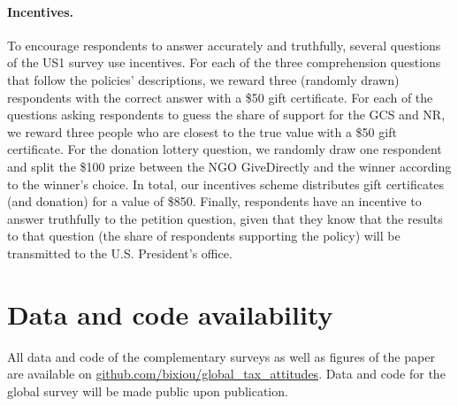 \begin{small}
\paragraph{\small Incentives.} %
To encourage respondents to answer accurately and truthfully, several questions of the US1 survey use incentives. For each of the three comprehension questions that follow the policies' descriptions, we reward three (randomly drawn) respondents with the correct answer with a \$50 gift certificate. For each of the questions asking respondents to guess the share of support for the GCS and NR, we reward three people who are closest to the true value with a \$50 gift certificate. For the donation lottery question, we randomly draw one respondent and split the \$100 prize between the NGO GiveDirectly and the winner according to the winner's choice. In total, our incentives scheme distributes gift certificates (and donation) for a value of \$850. Finally, respondents have an incentive to answer truthfully to the petition question, given that they know that the results to that question (the share of respondents supporting the policy) will be transmitted to the U.S. President's office.


\section*{\normalsize Data and code availability}

All data and code of the complementary surveys as well as figures of the paper are available on \href{https://github.com/bixiou/global_tax_attitudes}{github.com/bixiou/global\_tax\_attitudes}. Data and code for the global survey will be made public upon publication.

\end{small}  %

\renewcommand{\url}[1]{\href{#1}{Link}} %


